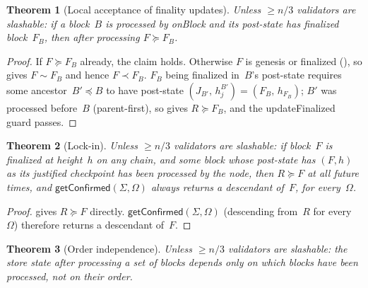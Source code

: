 \ifx\litemode\undefined\documentclass{article}\fi
\newcommand{\onBlock}{\textsf{onBlock}\xspace}
\newcommand{\updateFinalized}{\textsf{updateFinalized}\xspace}
\newcommand{\getConfirmed}{\textsf{getConfirmed}\xspace}
\theoremstyle{plain}
\newtheorem{theorem}{Theorem}
\theoremstyle{definition}
\theoremstyle{remark}
\begin{document}
\begin{theorem}[Local acceptance of finality updates]\label{thm:finlive}
Unless $\geq n/3$ validators are slashable: if a block~$B$ is processed by \onBlock and its post-state has finalized block~$F_B$, then after processing $F \succeq F_B$.
\end{theorem}

\begin{proof}
If $F \succeq F_B$ already, the claim holds.
Otherwise $F$ is genesis or finalized (), so  gives $F \sim F_B$ and hence $F \prec F_B$.
$F_B$ being finalized in~$B$'s post-state requires some ancestor~$B' \preceq B$ to have post-state $(J_{B'},\, h_j^{B'}) = (F_B,\, h_{F_B})$; $B'$ was processed before~$B$ (parent-first), so  gives $R \succeq F_B$, and the \updateFinalized guard passes.
\end{proof}

\begin{theorem}[Lock-in]\label{thm:lockin}
Unless $\geq n/3$ validators are slashable: if block~$F$ is finalized at height~$h$ on any chain, and some block whose post-state has $(F, h)$ as its justified checkpoint has been processed by the node, then $R \succeq F$ at all future times, and $\getConfirmed(\Sigma, \Omega)$ always returns a descendant of~$F$, for every~$\Omega$.
\end{theorem}

\begin{proof}
 gives $R \succeq F$ directly.
$\getConfirmed(\Sigma, \Omega)$ (descending from~$R$ for every~$\Omega$) therefore returns a descendant of~$F$.
\end{proof}

\begin{theorem}[Order independence]\label{thm:orderindep}
Unless $\geq n/3$ validators are slashable: the store state after processing a set of blocks depends only on which blocks have been processed, not on their order.
\end{theorem}
\end{document}
